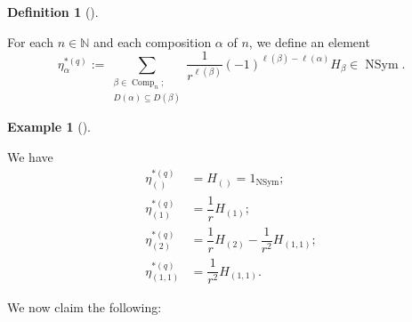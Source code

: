 \documentclass[numbers=enddot,12pt,final,onecolumn,notitlepage]{scrartcl}%
\theoremstyle{definition}
\newtheorem{defi}[theo]{Definition}
\newenvironment{definition}[1][]
{\begin{defi}[#1]\begin{leftbar}}
{\end{leftbar}\end{defi}}
\newtheorem{exam}[theo]{Example}
\newenvironment{example}[1][]
{\begin{exam}[#1]\begin{leftbar}}
{\end{leftbar}\end{exam}}
\let\sumnonlimits\sum
\renewcommand{\sum}{\sumnonlimits\limits}
\begin{document}
\begin{definition}
\label{def.etastar}For each $n\in\mathbb{N}$ and each composition $\alpha$ of
$n$, we define an element
\[
\eta_{\alpha}^{\ast\left(  q\right)  }:=\sum_{\substack{\beta\in
\operatorname*{Comp}\nolimits_{n};\\D\left(  \alpha\right)  \subseteq D\left(
\beta\right)  }}\dfrac{1}{r^{\ell\left(  \beta\right)  }}\left(  -1\right)
^{\ell\left(  \beta\right)  -\ell\left(  \alpha\right)  }H_{\beta}%
\in\operatorname*{NSym}.
\]

\end{definition}

\begin{example}
We have
\begin{align*}
\eta_{\left(  {}\right)  }^{\ast\left(  q\right)  }  &  =H_{\left(  {}\right)
}=1_{\operatorname*{NSym}};\\
\eta_{\left(  1\right)  }^{\ast\left(  q\right)  }  &  =\dfrac{1}{r}H_{\left(
1\right)  };\\
\eta_{\left(  2\right)  }^{\ast\left(  q\right)  }  &  =\dfrac{1}{r}H_{\left(
2\right)  }-\dfrac{1}{r^{2}}H_{\left(  1,1\right)  };\\
\eta_{\left(  1,1\right)  }^{\ast\left(  q\right)  }  &  =\dfrac{1}{r^{2}%
}H_{\left(  1,1\right)  }.
\end{align*}

\end{example}

We now claim the following:
\end{document}
